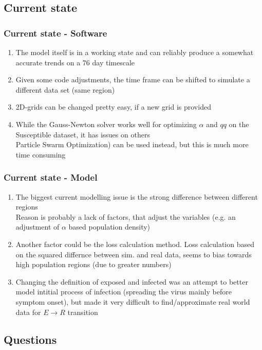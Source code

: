 \documentclass{beamer}
\begin{document}
\subsection{Current state}
\begin{frame}
	\frametitle{Current state - Software}
	\begin{enumerate}[$\bullet$]
		\item The model itself is in a working state and can reliably produce a somewhat accurate trends on a 76 day timescale
		\item Given some code adjustments, the time frame can be shifted to simulate a different data set (same region)
		\item 2D-grids can be changed pretty easy, if a new grid is provided
		\item While the Gauss-Newton solver works well for optimizing $\alpha$ and $qq$ on the Susceptible dataset, it has issues on others\\
			Particle Swarm Optimization) can be used instead, but this is much more time consuming
	\end{enumerate}
\end{frame}

\begin{frame}
	\frametitle{Current state - Model}
	\begin{enumerate}[$\bullet$]
		\item The biggest current modelling issue is the strong difference between different regions\\
			Reason is probably a lack of factors, that adjust the variables (e.g. an adjustment of $\alpha$ based population density)
		\item Another factor could be the loss calculation method. Loss calculation based on the squared differnce between sim.
			and real data, seems to bias towards high population regions (due to greater numbers)
		\item Changing the definition of exposed and infected was an attempt to better model intitial process of infection (spreading the virus mainly
			before symptom onset), but made it very difficult to find/approximate real world data for $E\rightarrow R$ transition
	\end{enumerate}
\end{frame}

\subsection{Questions}
\end{document}
